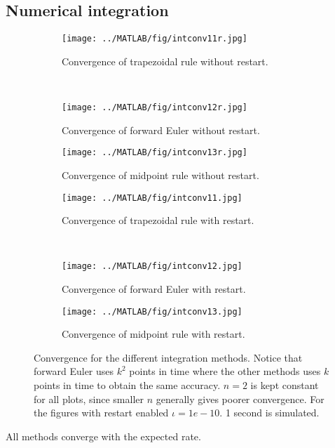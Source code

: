 \subsection{Numerical integration}%
\begin{figure}[H]
        \centering
        \begin{subfigure}[b]{0.30\textwidth}
                \texttt{[image: ../MATLAB/fig/intconv11r.jpg]}
                \caption{ Convergence of trapezoidal rule without restart. }
                \label{fig:intconv11r}
        \end{subfigure}
        ~
        \begin{subfigure}[b]{0.30\textwidth}
                \texttt{[image: ../MATLAB/fig/intconv12r.jpg]}
                \caption{ Convergence of forward Euler without restart. }
                \label{fig:intconv12r}
        \end{subfigure}
        \begin{subfigure}[b]{0.30\textwidth}
                \texttt{[image: ../MATLAB/fig/intconv13r.jpg]}
                \caption{ Convergence of midpoint rule without restart. }
                \label{fig:intconv13r}
        \end{subfigure}         
        
        \begin{subfigure}[b]{0.30\textwidth}
                \texttt{[image: ../MATLAB/fig/intconv11.jpg]}
                \caption{ Convergence of trapezoidal rule with restart. }
                \label{fig:intconv11}
        \end{subfigure}
        ~
        \begin{subfigure}[b]{0.30\textwidth}
                \texttt{[image: ../MATLAB/fig/intconv12.jpg]}
                \caption{ Convergence of forward Euler with restart. }
                \label{fig:intconv12}
        \end{subfigure}
        \begin{subfigure}[b]{0.30\textwidth}
                \texttt{[image: ../MATLAB/fig/intconv13.jpg]}
                \caption{ Convergence of midpoint rule with restart. }
                \label{fig:intconv13}
        \end{subfigure}
        
 
\caption{ Convergence for the different integration methods. Notice that forward Euler uses $k^2$ points in time where the other methods uses $k$ points in time to obtain the same accuracy. $n=2$ is kept constant for all plots, since smaller $n$ generally gives poorer convergence. For the figures with restart enabled $\iota = 1e-10$. 1 second is simulated. }
\label{fig:intconv}
\end{figure}
\noindent All methods converge with the expected rate. \\

